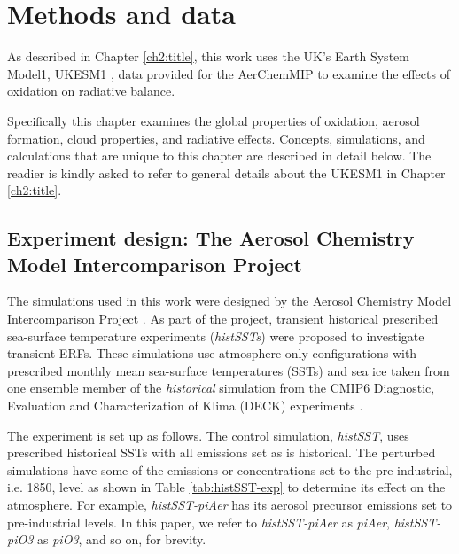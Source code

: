 \section{Methods and data}

As described in Chapter \ref{ch2:title}, this work uses the UK's Earth System Model1, UKESM1 \citep{sellarUKESM1DescriptionEvaluation2019}, data provided for the AerChemMIP \citep{collinsAerChemMIPQuantifyingEffects2017} to examine the effects of  oxidation on radiative balance. 

Specifically this chapter examines the global properties of  oxidation, aerosol formation, cloud properties, and radiative effects. Concepts, simulations, and calculations that are unique to this chapter are described in detail below. The readier is kindly asked to refer to general details about the UKESM1 in Chapter \ref{ch2:title}.

\subsection{Experiment design: The Aerosol Chemistry Model Intercomparison Project}
\label{sec:aerchemmip}
The simulations used in this work were designed by the Aerosol Chemistry Model Intercomparison Project \citep[AerChemMIP;][]{collinsAerChemMIPQuantifyingEffects2017}. As part of the project, transient historical prescribed sea-surface temperature experiments (\textit{histSSTs}) were proposed to investigate transient ERFs. These simulations use atmosphere-only configurations with prescribed monthly mean sea-surface temperatures (SSTs) and sea ice taken from one ensemble member of the \textit{historical} simulation from the CMIP6 Diagnostic, Evaluation and Characterization of Klima (DECK) experiments \citep{eyringOverviewCoupledModel2016}. 


The experiment is set up as follows. The control simulation, \textit{histSST}, uses prescribed historical SSTs with all emissions set as is historical. The perturbed simulations have some of the emissions or concentrations set to the pre-industrial, i.e. 1850, level as shown in Table \ref{tab:histSST-exp} to determine its effect on the atmosphere. For example, \textit{histSST-piAer} has its aerosol precursor emissions set to pre-industrial levels. In this paper, we refer to \textit{histSST-piAer} as \textit{piAer}, \textit{histSST-piO3} as \textit{piO3}, and so on, for brevity. 


